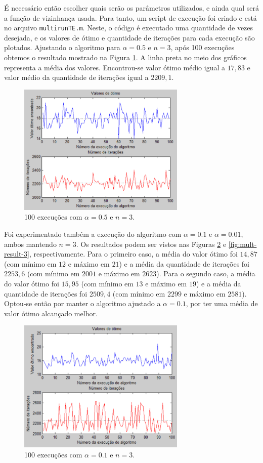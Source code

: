 \documentclass[conference]{IEEEtran}
\begin{document}
É necessário então escolher quais serão os parâmetros utilizados, e ainda qual será a função de vizinhança usada. Para tanto, um script de execução foi criado e está no arquivo \texttt{multirunTE.m}. Neste, o código é executado uma quantidade de vezes desejada, e os valores de ótimo e quantidade de iterações para cada execução são plotados. Ajustando o algoritmo para $\alpha = 0.5$ e $n = 3$, após 100 execuções obtemos o resultado mostrado na Figura \ref{fig:mult-result-1}. A linha preta no meio dos gráficos representa a média dos valores. Encontrou-se valor ótimo médio igual a $17,83$ e valor médio da quantidade de iterações igual a $2209,1$.

	\begin{figure}[h]
		\centering
		\includegraphics[width=8cm]{img/mult-result-1.png}
		\caption{100 execuções com $\alpha = 0.5$ e $n = 3$.}
		\label{fig:mult-result-1}
	\end{figure}

Foi experimentado também a execução do algoritmo com $\alpha = 0.1$ e $\alpha = 0.01$, ambos mantendo $n = 3$. Os resultados podem ser vistos nas Figuras \ref{fig:mult-result-2} e \ref{fig:mult-result-3}, respectivamente. Para o primeiro caso, a média do valor ótimo foi $14,87$ (com mínimo em $12$ e máximo em $21$) e a média da quantidade de iterações foi $2253,6$ (com mínimo em $2001$ e máximo em $2623$). Para o segundo caso, a média do valor ótimo foi $15,95$ (com mínimo em $13$ e máximo em $19$) e a média da quantidade de iterações foi $2509,4$ (com mínimo em $2299$ e máximo em $2581$). Optou-se então por manter o algoritmo ajustado a $\alpha = 0.1$, por ter uma média de valor ótimo alcançado melhor.

	\begin{figure}[h]
		\centering
		\includegraphics[width=8cm]{img/mult-result-2.png}
		\caption{100 execuções com $\alpha = 0.1$ e $n = 3$.}
		\label{fig:mult-result-2}
	\end{figure}
	
\end{document}
